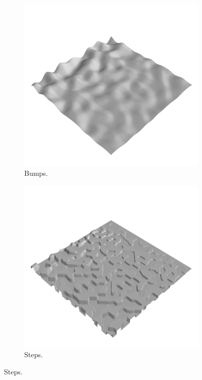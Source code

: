 \documentclass[../document.tex]{subfiles}
\begin{document}
\begin{figure}[htbp]
\begin{subfigure}[b]{0.24\textwidth}
        \includegraphics[width=\linewidth]{../img/hm3d/bumps2.png}
        \caption{Bumps.}
 \end{subfigure}  
    \begin{subfigure}[b]{0.24\textwidth}
        \includegraphics[width=\linewidth]{../img/hm3d/steps1.png}
        \caption{Steps.}

\end{subfigure}
\end{figure}
\end{document}
